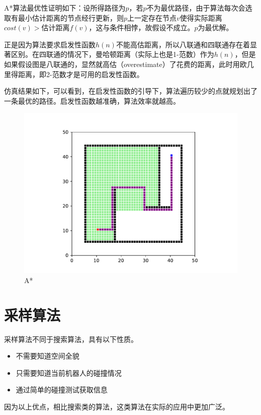 \documentclass[12pt]{article}
\begin{document}
    \pagebreak

    A*算法最优性证明如下：设所得路径为$p$，若$p$不为最优路径，由于算法每次会选取有最小估计距离的节点经行更新，则$p$上一定存在节点$v$使得实际距离$cost(v)>$估计距离$f(v)$，这与条件相悖，故假设不成立。$p$为最优解。

    正是因为算法要求启发性函数$h(n)$不能高估距离，所以八联通和四联通存在着显著区别。在四联通的情况下，曼哈顿距离（实际上也是1-范数）作为$h(n)$，但是如果假设图是八联通的，显然就高估（overestimate）了花费的距离，此时用欧几里得距离，即2-范数才是可用的启发性函数。

    仿真结果如下，可以看到，在启发性函数的引导下，算法遍历较少的点就规划出了一条最优的路径。启发性函数越准确，算法效率就越高。

    \begin{figure}[h]
        \centering
        \includegraphics[scale=0.7]{fig/A_star.pdf}
        \caption{A*}
    \end{figure}

    \section{采样算法}
    采样算法不同于搜索算法，具有以下性质。
    \begin{itemize}
        \item 不需要知道空间全貌
        \item 只需要知道当前机器人的碰撞情况
        \item 通过简单的碰撞测试获取信息
    \end{itemize}
    因为以上优点，相比搜索类的算法，这类算法在实际的应用中更加广泛。
\end{document}
